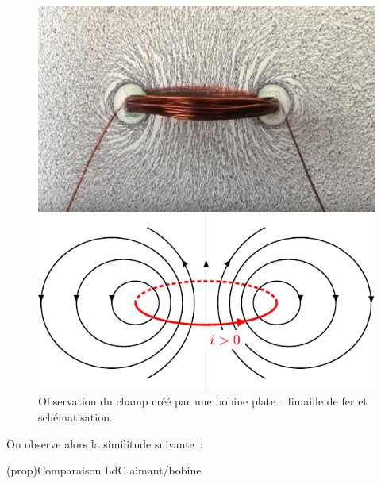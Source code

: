 \documentclass[../../main/main.tex]{subfiles}
\begin{document}
\begin{figure}[h]
	\noindent
	\begin{minipage}[c]{.48\linewidth}
		\includegraphics[width=\linewidth]{bplate_lim.jpg}
	\end{minipage}
	\hfill
	\begin{minipage}[c]{.48\linewidth}
		\includegraphics[width=\linewidth]{bplate_chp}
	\end{minipage}
	\caption{Observation du champ créé par une bobine plate~: limaille de fer et
		schématisation.}
	\label{fig:bplate}
\end{figure}
On observe alors la similitude suivante~:
\begin{tcb*}(prop){Comparaison LdC aimant/bobine}
	\begin{center}
	\end{center}
\end{tcb*}
\end{document}
